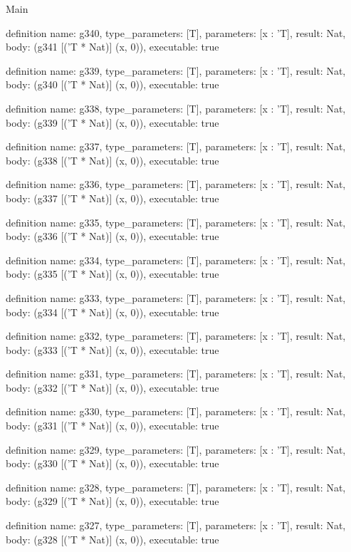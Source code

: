 \begin{lexlean}{Main}
\begin{semanticmodule}
definition{
  name: g340,
  type_parameters: [T],
  parameters: [x : 'T],
  result: Nat,
  body: (g341 [('T * Nat)] (x, 0)),
  executable: true
}

definition{
  name: g339,
  type_parameters: [T],
  parameters: [x : 'T],
  result: Nat,
  body: (g340 [('T * Nat)] (x, 0)),
  executable: true
}

definition{
  name: g338,
  type_parameters: [T],
  parameters: [x : 'T],
  result: Nat,
  body: (g339 [('T * Nat)] (x, 0)),
  executable: true
}

definition{
  name: g337,
  type_parameters: [T],
  parameters: [x : 'T],
  result: Nat,
  body: (g338 [('T * Nat)] (x, 0)),
  executable: true
}

definition{
  name: g336,
  type_parameters: [T],
  parameters: [x : 'T],
  result: Nat,
  body: (g337 [('T * Nat)] (x, 0)),
  executable: true
}

definition{
  name: g335,
  type_parameters: [T],
  parameters: [x : 'T],
  result: Nat,
  body: (g336 [('T * Nat)] (x, 0)),
  executable: true
}

definition{
  name: g334,
  type_parameters: [T],
  parameters: [x : 'T],
  result: Nat,
  body: (g335 [('T * Nat)] (x, 0)),
  executable: true
}

definition{
  name: g333,
  type_parameters: [T],
  parameters: [x : 'T],
  result: Nat,
  body: (g334 [('T * Nat)] (x, 0)),
  executable: true
}

definition{
  name: g332,
  type_parameters: [T],
  parameters: [x : 'T],
  result: Nat,
  body: (g333 [('T * Nat)] (x, 0)),
  executable: true
}

definition{
  name: g331,
  type_parameters: [T],
  parameters: [x : 'T],
  result: Nat,
  body: (g332 [('T * Nat)] (x, 0)),
  executable: true
}

definition{
  name: g330,
  type_parameters: [T],
  parameters: [x : 'T],
  result: Nat,
  body: (g331 [('T * Nat)] (x, 0)),
  executable: true
}

definition{
  name: g329,
  type_parameters: [T],
  parameters: [x : 'T],
  result: Nat,
  body: (g330 [('T * Nat)] (x, 0)),
  executable: true
}

definition{
  name: g328,
  type_parameters: [T],
  parameters: [x : 'T],
  result: Nat,
  body: (g329 [('T * Nat)] (x, 0)),
  executable: true
}

definition{
  name: g327,
  type_parameters: [T],
  parameters: [x : 'T],
  result: Nat,
  body: (g328 [('T * Nat)] (x, 0)),
  executable: true
}


\end{semanticmodule}
\end{lexlean}
